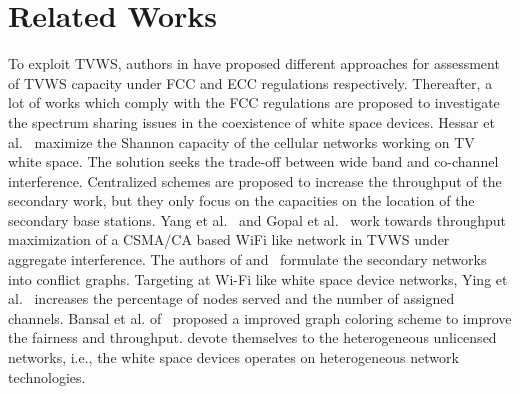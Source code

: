 \documentclass[times]{ettauth}
\newcommand{\ie}{i.e., }
\theoremstyle{mytheoremstyle}
\theoremstyle{mytheoremstyle}
\theoremstyle{mytheoremstyle}
\begin{document}
\section{Related Works}
\label{decomposition_relatedwork}




To exploit TVWS, authors in \cite{DySpAN10MeasuringWhitespaceCapacity, HessarTMC15, Deshmukh2015, Achtzehn12} have proposed different approaches for assessment of TVWS capacity under FCC and ECC regulations respectively.
Thereafter, a lot of works which comply with the FCC regulations are proposed to investigate the spectrum sharing issues in the coexistence of white space devices.
Hessar et al.~\cite{ReAlloTVWS14DySPAN} maximize the Shannon capacity of the cellular networks working on TV white space.
The solution seeks the trade-off between wide band and co-channel interference.
Centralized schemes are proposed to increase the throughput of the secondary work, but they only focus on the capacities on the location of the secondary base stations.
Yang et al.~\cite{yang2013WiFiWSTVCapacity} and Gopal et al.~\cite{gopalTCCN16} work towards throughput maximization of a CSMA/CA based WiFi like network in TVWS under aggregate interference.
The authors of \cite{TMC14channelScharing} and~\cite{conflictGraphTWC2018} formulate the secondary networks into conflict graphs. 
Targeting at Wi-Fi like white space device networks, Ying et al.~\cite{conflictGraphTWC2018} increases the percentage of nodes served and the number of assigned channels. 
Bansal et al. of~\cite{TMC14channelScharing} proposed a improved graph coloring scheme to improve the fairness and throughput.
\cite{TWC17HeteroWS, TWC14HeteroWS} devote themselves to the heterogeneous unlicensed networks, \ie the white space devices operates on heterogeneous network technologies.
\end{document}
